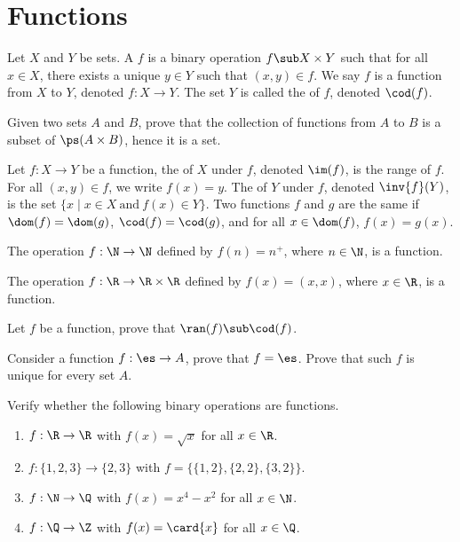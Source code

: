 \documentclass[10pt]{article}
\begin{document}
\section{Functions}
\begin{definition}
    Let $X$ and $Y$ be sets. A  $f$ is a binary operation $f\sub X\times Y$ such that for all $x\in X$, there exists a unique $y\in Y$ such that $(x,y)\in f$. We say $f$ is a function from $X$ to $Y$, denoted $f:X\to Y$. The set $Y$ is called the  of $f$, denoted $\cod(f)$.
\end{definition}
\begin{problem}
    Given two sets $A$ and $B$, prove that the collection of functions from $A$ to $B$ is a subset of $\ps(A\times B)$, hence it is a set.
\end{problem}
\begin{definition}
    Let $f:X\to Y$ be a function, the  of $X$ under $f$, denoted $\im(f)$, is the range of $f$. For all $(x,y)\in f$, we write $f(x)=y$. The  of $Y$ under $f$, denoted $\inv{f}(Y)$, is the set $\{x\mid x\in X\ \text{and}\ f(x)\in Y\}$. Two functions $f$ and $g$ are the same if $\dom(f)=\dom(g)$, $\cod(f)=\cod(g)$, and for all $x\in\dom(f)$, $f(x)=g(x)$.
\end{definition}
\begin{example}
    The operation $f:\N\to\N$ defined by $f(n)={n}^{+}$, where $n\in\N$, is a function.
\end{example}
\begin{example}
    The operation $f:\R\to\R\times\R$ defined by $f(x)=(x,x)$, where $x\in\R$, is a function.
\end{example}
\begin{problem}
    Let $f$ be a function, prove that $\ran(f)\sub\cod(f)$.
\end{problem}
\begin{problem}
    Consider a function $f:\es\to A$, prove that $f=\es$. Prove that such $f$ is unique for every set $A$.
\end{problem}
\begin{problem}
    Verify whether the following binary operations are functions.
    \begin{enumerate}
        \item $f:\R\to\R$ with $f(x)=\sqrt{x}$ for all $x\in\R$.
        \item $f:\{1,2,3\}\to\{2,3\}$ with $f=\{\{1,2\},\{2,2\},\{3,2\}\}$.
        \item $f:\N\to\Q$ with $f(x)={x}^{4}-{x}^{2}$ for all $x\in\N$.
        \item $f:\Q\to\Z$ with $f(x)=\card{x}$ for all $x\in\Q$.
    \end{enumerate}
\end{problem}
\end{document}
